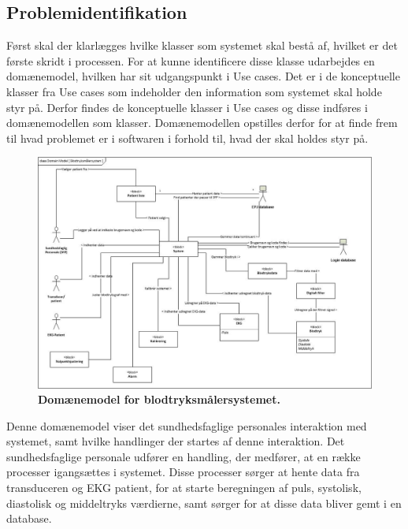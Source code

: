 \subsection{Problemidentifikation}
Først skal der klarlægges hvilke klasser som systemet skal bestå af, hvilket er det første skridt i processen. For at kunne identificere disse klasse udarbejdes en domænemodel, hvilken har sit udgangspunkt i Use cases. Det er i de konceptuelle klasser fra Use cases som indeholder den information som systemet skal holde styr på. Derfor findes de konceptuelle klasser i Use cases og disse indføres i domænemodellen som klasser. Domænemodellen opstilles derfor for at finde frem til hvad problemet er i softwaren i forhold til, hvad der skal holdes styr på.
\begin{figure}[h!]
\includegraphics[width =1.0\textwidth , center]{billeder/DM}
\caption{\textbf{Domænemodel for blodtryksmålersystemet.}}
\end{figure}
Denne domænemodel viser det sundhedsfaglige personales interaktion med systemet, samt hvilke handlinger der startes af denne interaktion. Det sundhedsfaglige personale udfører en handling, der medfører, at en række processer igangsættes i systemet. Disse processer sørger at hente data fra transduceren og EKG patient, for at starte beregningen af puls, systolisk, diastolisk og middeltryks værdierne, samt sørger for at disse data bliver gemt i en database.
\\
